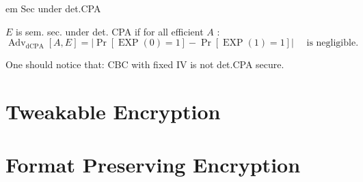 \begin{definition}  em Sec under det.CPA

    $E$ is sem. sec. under det. CPA if for all efficient $A$ :
    $$
    \operatorname{Adv}_{\mathrm{dCPA}}[A, E]=|\operatorname{Pr}[\operatorname{EXP}(0)=1]-\operatorname{Pr}[\operatorname{EXP}(1)=1]| \quad \text { is negligible. }
    $$
    
\end{definition}

One should notice that: CBC with fixed IV is not det.CPA secure.


\section{Tweakable Encryption}



\section{Format Preserving Encryption}